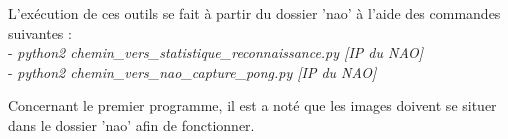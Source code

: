   \par L'exécution de ces outils se fait à partir du dossier 'nao' à l'aide des commandes suivantes : \\
  - \textit{python2 chemin\_vers\_statistique\_reconnaissance.py [IP du NAO]}\\
  - \textit{python2 chemin\_vers\_nao\_capture\_pong.py [IP du NAO]}


  \par Concernant le premier programme, il est a noté que les images doivent se situer dans le dossier 'nao' afin de fonctionner.
\pagebreak
